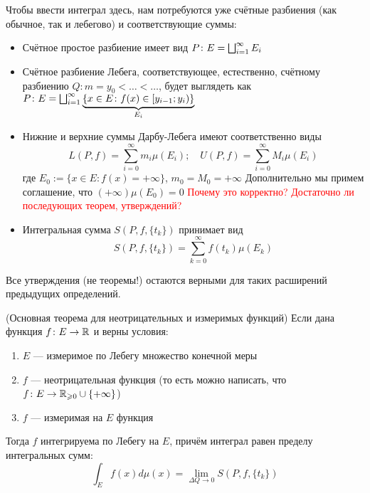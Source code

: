 \begin{note}
	Чтобы ввести интеграл здесь, нам потребуются уже счётные разбиения (как обычное, так и лебегово) и соответствующие суммы:
	\begin{itemize}
		\item Счётное простое разбиение имеет вид $P \colon E = \bigsqcup_{i = 1}^\infty E_i$
		
		\item Счётное разбиение Лебега, соответствующее, естественно, счётному разбиению $Q \colon m = y_0 < \ldots < \ldots$, будет выглядеть как $P \colon E = \bigsqcup_{i = 1}^\infty \underbrace{\{x \in E \colon f(x) \in \left[y_{i - 1}; y_i\right)\}}_{E_i}$
		
		\item Нижние и верхние суммы Дарбу-Лебега имеют соответственно виды 
		\[
			L(P, f) = \sum_{i = 0}^\infty m_i \mu(E_i); \quad U(P, f) = \sum_{i = 0}^\infty M_i \mu(E_i)
		\]
		где $E_0 := \{x \in E \colon f(x) = +\infty\}$, $m_0 = M_0 = +\infty$ Дополнительно мы примем соглашение, что $(+\infty) \mu(E_0) = 0$ \textcolor{red}{Почему это корректно? Достаточно ли последующих теорем, утверждений?}
		
		\item Интегральная сумма $S(P, f, \{t_k\})$ принимает вид
		\[
			S(P, f, \{t_k\}) = \sum_{k = 0}^\infty f(t_k) \mu(E_k)
		\]
	\end{itemize}
	Все утверждения (не теоремы!) остаются верными для таких расширений предыдущих определений.
\end{note}

\begin{theorem} (Основная теорема для неотрицательных и измеримых функций)
	Если дана функция $f \colon E \to \mathbb{R}$ и верны условия:
	\begin{enumerate}
		\item $E$ --- измеримое по Лебегу множество конечной меры
		
		\item $f$ --- неотрицательная функция (то есть можно написать, что $f \colon E \to \mathbb{R}_{\geqslant 0} \cup \{+\infty\}$)
		
		\item $f$ --- измеримая на $E$ функция
	\end{enumerate}
	Тогда $f$ интегрируема по Лебегу на $E$, причём интеграл равен пределу интегральных сумм:
	\[
		\int_E f(x)d\mu(x) = \lim_{\Delta Q \to 0} S(P, f, \{t_k\})
	\]
\end{theorem}

